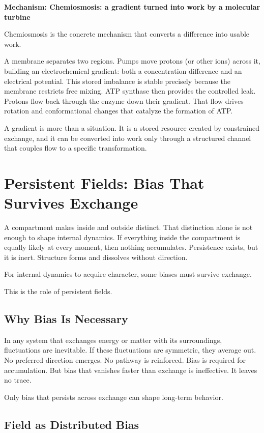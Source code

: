 \documentclass[11pt,twoside,openright]{book}
\newenvironment{mechanismbox}[1]
  {\begin{framed}\noindent\textbf{Mechanism: #1}\par\medskip}
  {\end{framed}}
\begin{document}
\begin{mechanismbox}{Chemiosmosis: a gradient turned into work by a molecular turbine}
Chemiosmosis is the concrete mechanism that converts a difference into usable work.

A membrane separates two regions. Pumps move protons (or other ions) across it, building an electrochemical gradient: both a concentration difference and an electrical potential. This stored imbalance is stable precisely because the membrane restricts free mixing. ATP synthase then provides the controlled leak. Protons flow back through the enzyme down their gradient. That flow drives rotation and conformational changes that catalyze the formation of ATP.

A gradient is more than a situation. It is a stored resource created by constrained exchange, and it can be converted into work only through a structured channel that couples flow to a specific transformation.
\end{mechanismbox}

\chapter{Persistent Fields: Bias That Survives Exchange}

A compartment makes inside and outside distinct. That distinction alone is not enough to shape internal dynamics. If everything inside the compartment is equally likely at every moment, then nothing accumulates. Persistence exists, but it is inert. Structure forms and dissolves without direction.

For internal dynamics to acquire character, some biases must survive exchange.

This is the role of persistent fields.

\section*{Why Bias Is Necessary}

In any system that exchanges energy or matter with its surroundings, fluctuations are inevitable. If these fluctuations are symmetric, they average out. No preferred direction emerges. No pathway is reinforced. Bias is required for accumulation. But bias that vanishes faster than exchange is ineffective. It leaves no trace.

Only bias that persists across exchange can shape long-term behavior.

\section*{Field as Distributed Bias}
\end{document}
